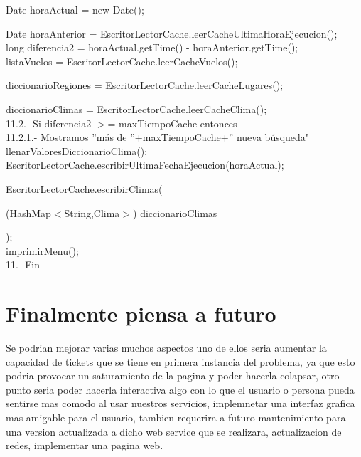 \documentclass[30pt]{article}
\theoremstyle{definition}
\begin{document}
  \hspace{3cm} Date horaActual = new Date();
  
  \hspace{3cm} Date horaAnterior = EscritorLectorCache.leerCacheUltimaHoraEjecucion();\\

  \hspace{3cm} long diferencia2 = horaActual.getTime() - horaAnterior.getTime();\\

  \hspace{3cm} listaVuelos = EscritorLectorCache.leerCacheVuelos();
  
  \hspace{3cm} diccionarioRegiones = EscritorLectorCache.leerCacheLugares();
  
  \hspace{3cm} diccionarioClimas = EscritorLectorCache.leerCacheClima();\\
  
  \hspace{3cm} 11.2.- Si diferencia2 $>$= maxTiempoCache entonces\\
  
  \hspace{4cm} 11.2.1.- Mostramos ''más de ''+maxTiempoCache+'' nueva búsqueda"\\
  
  \hspace{5cm} llenarValoresDiccionarioClima();\\
  
  \hspace{5cm} EscritorLectorCache.escribirUltimaFechaEjecucion(horaActual);
  
  \hspace{5cm} EscritorLectorCache.escribirClimas(
  
  \hspace{6cm} (HashMap$<$String,Clima$>$) diccionarioClimas
  
  \hspace{5cm} );\\
  
  \hspace{3cm} imprimirMenu();\\
  
11.- Fin


\newpage    
\section{Finalmente piensa a futuro}

{\large Se podrian mejorar varias muchos aspectos uno de ellos seria aumentar la capacidad de tickets que se tiene en primera instancia del problema, ya que esto podria provocar un saturamiento de la pagina y poder hacerla colapsar, otro punto seria poder hacerla interactiva algo con lo que el usuario o persona pueda sentirse mas comodo al usar nuestros servicios, implemnetar una interfaz grafica mas amigable para el usuario, tambien requerira a futuro mantenimiento para una version actualizada a dicho web service que se realizara, actualizacion de redes, implementar una pagina web. } 
\end{document}
